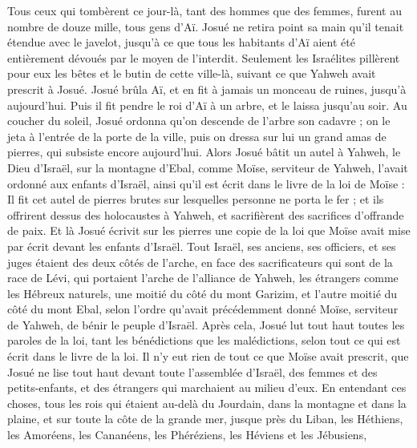 \begin{multicols}{2}
Tous ceux qui tombèrent ce jour-là, tant des hommes que des femmes, furent au nombre de douze mille, tous gens d’Aï.
Josué ne retira point sa main qu’il tenait étendue avec le javelot, jusqu’à ce que tous les habitants d’Aï aient été entièrement dévoués par le moyen de l'interdit.
Seulement les Israélites pillèrent pour eux les bêtes et le butin de cette ville-là, suivant ce que Yahweh avait prescrit à Josué.
Josué brûla Aï, et en fit à jamais un monceau de ruines, jusqu’à aujourd’hui.
Puis il fit pendre le roi d’Aï à un arbre, et le laissa jusqu’au soir. Au coucher du soleil, Josué ordonna qu’on descende de l’arbre son cadavre ; on le jeta à l’entrée de la porte de la ville, puis on dressa sur lui un grand amas de pierres, qui subsiste encore aujourd’hui.
Alors Josué bâtit un autel à Yahweh, le Dieu d’Israël, sur la montagne d’Ebal,
comme Moïse, serviteur de Yahweh, l’avait ordonné aux enfants d’Israël, ainsi qu’il est écrit dans le livre de la loi de Moïse : Il fit cet autel de pierres brutes sur lesquelles personne ne porta le fer ; et ils offrirent dessus des holocaustes à Yahweh, et sacrifièrent des sacrifices d’offrande de paix.
Et là Josué écrivit sur les pierres une copie de la loi que Moïse avait mise par écrit devant les enfants d’Israël.
Tout Israël, ses anciens, ses officiers, et ses juges étaient des deux côtés de l’arche, en face des sacrificateurs qui sont de la race de Lévi, qui portaient l’arche de l’alliance de Yahweh, les étrangers comme les Hébreux naturels, une moitié du côté du mont Garizim, et l’autre moitié du côté du mont Ebal, selon l’ordre qu’avait précédemment donné Moïse, serviteur de Yahweh, de bénir le peuple d’Israël.
Après cela, Josué lut tout haut toutes les paroles de la loi, tant les bénédictions que les malédictions, selon tout ce qui est écrit dans le livre de la loi.
Il n’y eut rien de tout ce que Moïse avait prescrit, que Josué ne lise tout haut devant toute l’assemblée d’Israël, des femmes et des petits-enfants, et des étrangers qui marchaient au milieu d’eux.
\VerseOne{}En entendant ces choses, tous les rois qui étaient au-delà du Jourdain, dans la montagne et dans la plaine, et sur toute la côte de la grande mer, jusque près du Liban, les Héthiens, les Amoréens, les Cananéens, les Phéréziens, les Héviens et les Jébusiens,

\end{multicols}
